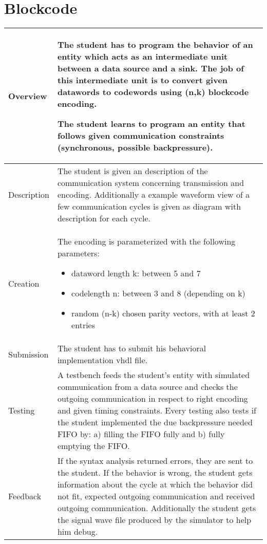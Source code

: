 \section{Blockcode}
    \begin{tabular}{|p{2cm}|p{13cm}|}
        \hline
        Overview & The student has to program the behavior of an entity which acts as an intermediate unit between a
			data source and a sink. The job of this intermediate unit is to convert given datawords to codewords using
			(n,k) blockcode encoding.

			The student learns to program an entity that follows given communication constraints (synchronous,
			possible backpressure).
        \\
        \hline
        Description & The student is given an description of the communication system concerning transmission and
			encoding. Additionally a example waveform view of a few communication cycles is given as diagram with
			description for each cycle.
        \\
        \hline
        Creation & The encoding is parameterized with the following parameters:
			\begin{itemize}
				\item dataword length k: between 5 and 7
				\item codelength n: between 3 and 8 (depending on k)
				\item random (n-k) chosen parity vectors, with at least 2 entries
			\end{itemize}
		\\
        \hline
        Submission & The student has to submit his behavioral implementation vhdl file.
        \\
        \hline
        Testing & A testbench feeds the student's entity with simulated communication from a data source and checks
			the outgoing communication in respect to right encoding and given timing constraints. Every testing also
			tests if the student implemented the due backpressure needed FIFO by: a) filling the FIFO fully and b) fully
			emptying the FIFO.
        \\
        \hline
        Feedback & If the syntax analysis returned errors, they are sent to the student. If the behavior is wrong, the
			student gets information about the cycle at which the behavior did not fit, expected outgoing communication 
			and received outgoing communication. Additionally the student gets the signal wave file produced by the
			simulator to help him debug.
        \\
        \hline
    \end{tabular}

